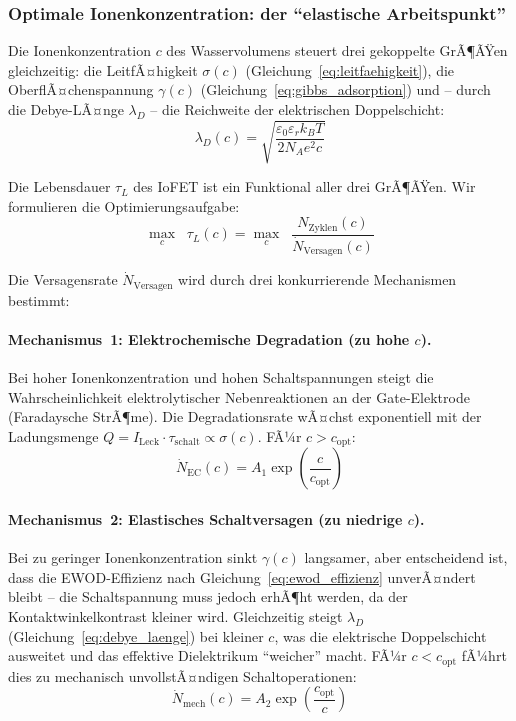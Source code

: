 ﻿\documentclass[a4paper,12pt]{scrreprt}
\theoremstyle{definition}
\begin{document}
\subsubsection{Optimale Ionenkonzentration: der ``elastische Arbeitspunkt''}

Die Ionenkonzentration $c$ des Wasservolumens steuert drei gekoppelte
GrÃ¶ÃŸen gleichzeitig: die LeitfÃ¤higkeit $\sigma(c)$
(Gleichung~\eqref{eq:leitfaehigkeit}), die OberflÃ¤chenspannung $\gamma(c)$
(Gleichung~\eqref{eq:gibbs_adsorption}) und -- durch die Debye-LÃ¤nge $\lambda_D$ --
die Reichweite der elektrischen Doppelschicht:
\begin{equation}
	\lambda_D(c) = \sqrt{\frac{\varepsilon_0 \varepsilon_r k_B T}{2 N_A e^2 c}}
	\label{eq:debye_laenge}
\end{equation}

Die Lebensdauer $\tau_L$ des IoFET ist ein Funktional aller drei GrÃ¶ÃŸen.
Wir formulieren die Optimierungsaufgabe:
\begin{equation}
	\max_{c} \;\; \tau_L(c) = \max_{c} \;\;
	\frac{N_{\mathrm{Zyklen}}(c)}{\dot{N}_{\mathrm{Versagen}}(c)}
	\label{eq:optimierungsproblem}
\end{equation}

Die Versagensrate $\dot{N}_{\mathrm{Versagen}}$ wird durch drei konkurrierende
Mechanismen bestimmt:

\paragraph{Mechanismus~1: Elektrochemische Degradation (zu hohe $c$).}
Bei hoher Ionenkonzentration und hohen Schaltspannungen steigt die Wahrscheinlichkeit
elektrolytischer Nebenreaktionen an der Gate-Elektrode (Faradaysche StrÃ¶me).
Die Degradationsrate wÃ¤chst exponentiell mit der Ladungsmenge
$Q = I_{\mathrm{Leck}} \cdot \tau_{\mathrm{schalt}} \propto \sigma(c)$. FÃ¼r $c > c_{\mathrm{opt}}$:
\begin{equation}
	\dot{N}_{\mathrm{EC}}(c) = A_1 \exp\!\left(\frac{c}{c_{\mathrm{opt}}}\right)
	\label{eq:versagen_ec}
\end{equation}

\paragraph{Mechanismus~2: Elastisches Schaltversagen (zu niedrige $c$).}
Bei zu geringer Ionenkonzentration sinkt $\gamma(c)$ langsamer, aber
entscheidend ist, dass die EWOD-Effizienz nach Gleichung~\eqref{eq:ewod_effizienz}
unverÃ¤ndert bleibt -- die Schaltspannung muss jedoch erhÃ¶ht werden, da
der Kontaktwinkelkontrast kleiner wird. Gleichzeitig steigt $\lambda_D$
(Gleichung~\eqref{eq:debye_laenge}) bei kleiner $c$, was die elektrische
Doppelschicht ausweitet und das effektive Dielektrikum ``weicher'' macht.
FÃ¼r $c < c_{\mathrm{opt}}$ fÃ¼hrt dies zu mechanisch unvollstÃ¤ndigen
Schaltoperationen:
\begin{equation}
	\dot{N}_{\mathrm{mech}}(c) = A_2 \exp\!\left(\frac{c_{\mathrm{opt}}}{c}\right)
	\label{eq:versagen_mech}
\end{equation}
\end{document}
